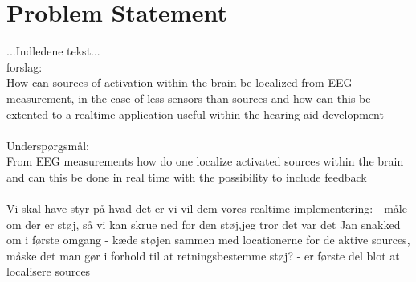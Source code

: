 \chapter{Problem Statement}
...Indledene tekst...\\ 

forslag:\\
How can sources of activation within the brain be localized from EEG measurement, in the case of less sensors than sources and how can this be extented to a realtime application useful within the hearing aid development\\
\\

Underspørgsmål:\\




From EEG measurements how do one localize activated sources within the brain and can this be done in real time with the possibility to include feedback 
\\ \\



Vi skal have styr på hvad det er vi vil dem vores realtime implementering: 
- måle om der er støj, så vi kan skrue ned for den støj,jeg tror det var det Jan snakked om i første omgang 
- kæde støjen sammen med locationerne for de aktive sources, måske det man gør i forhold til at retningsbestemme støj? 
- er første del blot at localisere sources  

 